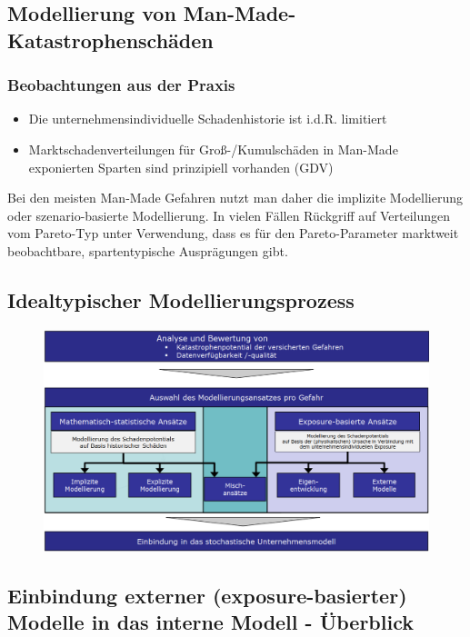 \documentclass[12pt]{report}
\theoremstyle{dotless}
\theoremstyle{definition}
\begin{document}
\subsection{Modellierung von Man-Made-Katastrophenschäden}

\subsubsection{Beobachtungen aus der Praxis}
\begin{itemize}
\item Die unternehmensindividuelle Schadenhistorie ist i.d.R. limitiert
\item Marktschadenverteilungen für Groß-/Kumulschäden in Man-Made exponierten Sparten sind prinzipiell vorhanden (GDV)
\end{itemize}
Bei den meisten Man-Made Gefahren nutzt man daher die implizite Modellierung oder szenario-basierte Modellierung. In vielen Fällen Rückgriff auf Verteilungen vom Pareto-Typ unter Verwendung, dass es für den
Pareto-Parameter marktweit beobachtbare, spartentypische Ausprägungen gibt.

\subsection{Idealtypischer Modellierungsprozess}

\begin{figure}[ht]
	\centering
	\includegraphics[width= \textwidth]{Bilder/Modellierungsprozess.png}
\end{figure}


\subsection{Einbindung externer (exposure-basierter) Modelle in das interne Modell -
Überblick}
\end{document}
